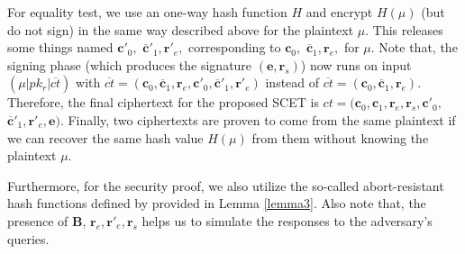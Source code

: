 \documentclass[a4paper,11pt,onecolumn]{elsarticle}
\begin{document}
	
	For equality test, we use an one-way  hash function $H$ and encrypt $H(\mu)$ (but do not sign) in the same way described above for the plaintext $\mu$. This releases some things named $\textbf{c}'_0,$ $ \overline{\textbf{c}}'_1, \textbf{r}'_e, $ corresponding to $\textbf{c}_0,$ $ \overline{\textbf{c}}_1, \textbf{r}_e, $ for $\mu$. Note that, the signing phase (which produces the signature $(\textbf{e}, \textbf{r}_s)$) now runs on input $(\mu|pk_r|\overline{ct})$ with $\overline{ct}=(\textbf{c}_0, \overline{\textbf{c}}_1, \textbf{r}_e, \textbf{c}'_0, \overline{\textbf{c}}'_1, \textbf{r}'_e)$ instead of $\overline{ct}=(\textbf{c}_0, \overline{\textbf{c}}_1, \textbf{r}_e)$. Therefore, the final ciphertext for the proposed SCET is   $ct=(\textbf{c}_0, \textbf{c}_1, \textbf{r}_e, \textbf{r}_s, \textbf{c}'_0,$ $ \overline{\textbf{c}}'_1, \textbf{r}'_e, \textbf{e})$. Finally,  two ciphertexts are proven to come from the same plaintext  if we can recover the same hash value $H(\mu)$ from them without knowing the plaintext $\mu$. 
	
	Furthermore, for the security proof, we also utilize the so-called abort-resistant hash functions defined by \cite[Section 7]{ABB10} provided in Lemma \ref{lemma3}.  Also note that, the presence of $\textbf{B}$, $\textbf{r}_e, \textbf{r}'_e, \textbf{r}_s$ helps us to simulate the responses to the adversary's queries.  \\ 
	
\end{document}
